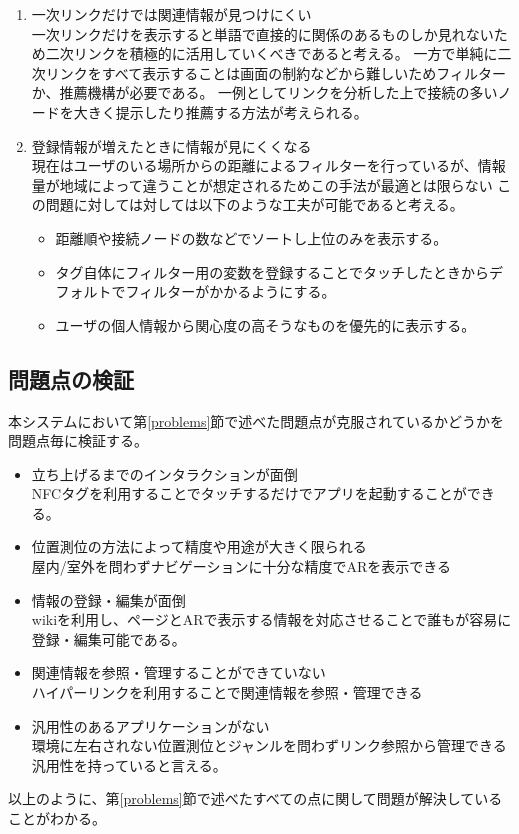 \begin{enumerate}
  \item 一次リンクだけでは関連情報が見つけにくい\\
  一次リンクだけを表示すると単語で直接的に関係のあるものしか見れないため二次リンクを積極的に活用していくべきであると考える。
  一方で単純に二次リンクをすべて表示することは画面の制約などから難しいためフィルターか、推薦機構が必要である。
  一例としてリンクを分析した上で接続の多いノードを大きく提示したり推薦する方法が考えられる。
  \item 登録情報が増えたときに情報が見にくくなる\\
  現在はユーザのいる場所からの距離によるフィルターを行っているが、情報量が地域によって違うことが想定されるためこの手法が最適とは限らない
  この問題に対しては対しては以下のような工夫が可能であると考える。
  \begin{itemize}
    \item 距離順や接続ノードの数などでソートし上位のみを表示する。
    \item タグ自体にフィルター用の変数を登録することでタッチしたときからデフォルトでフィルターがかかるようにする。
    \item ユーザの個人情報から関心度の高そうなものを優先的に表示する。
  \end{itemize}
   
\end{enumerate}

\subsection{問題点の検証}
本システムにおいて第\ref{problems}節で述べた問題点が克服されているかどうかを問題点毎に検証する。
\begin{itemize}
  \item 立ち上げるまでのインタラクションが面倒 \\
  NFCタグを利用することでタッチするだけでアプリを起動することができる。
  \item 位置測位の方法によって精度や用途が大きく限られる \\
  屋内/室外を問わずナビゲーションに十分な精度でARを表示できる
  \item 情報の登録・編集が面倒 \\
  wikiを利用し、ページとARで表示する情報を対応させることで誰もが容易に登録・編集可能である。
  \item 関連情報を参照・管理することができていない \\
  ハイパーリンクを利用することで関連情報を参照・管理できる
  \item 汎用性のあるアプリケーションがない \\
  環境に左右されない位置測位とジャンルを問わずリンク参照から管理できる汎用性を持っていると言える。
\end{itemize}
以上のように、第\ref{problems}節で述べたすべての点に関して問題が解決していることがわかる。